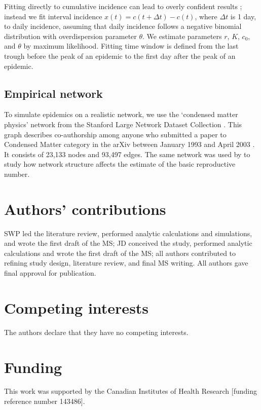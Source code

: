 \documentclass[12pt]{article}
\begin{document}
Fitting directly to cumulative incidence can lead to overly confident results \citep{king2015avoidable}; instead we fit interval incidence $x(t) = c(t + \Delta t) - c(t)$, where $\Delta t$ is 1 day, to daily incidence, assuming that daily incidence follows a negative binomial distribution with overdispersion parameter $\theta$.
We estimate parameters $r$, $K$, $c_0$, and $\theta$ by maximum likelihood.
Fitting time window is defined from the last trough before the peak of an epidemic to the first day after the peak of an epidemic.

\subsection{Empirical network}

To simulate epidemics on a realistic network, we use the `condensed matter physics' network from the Stanford Large Network Dataset Collection \citep{leskovec2016snap}.
This graph describes co-authorship among anyone who submitted a paper to Condensed Matter category in the arXiv between January 1993 and April 2003 \citep{leskovec2007graph}.
It consists of 23,133 nodes and 93,497 edges.
The same network was used by \cite{trapman2016inferring} to study how network structure affects the estimate of the basic reproductive number.

\section*{Authors' contributions}

SWP led the literature review, performed analytic calculations and simulations, and wrote the first draft of the MS; JD conceived the study, performed analytic calculations and wrote the first draft of the MS; all authors contributed to refining study design, literature review, and final MS writing. All authors gave final approval for publication. 

\section*{Competing interests}

The authors declare that they have no competing interests.

\section*{Funding}

This work was supported by the Canadian Institutes of Health Research [funding reference number 143486].
\end{document}
